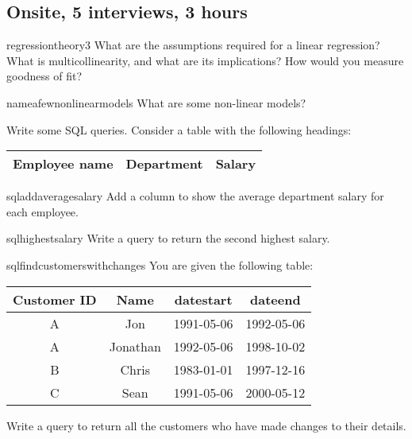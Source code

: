 \documentclass[a4paper]{article}
\begin{document}
\clearpage





\clearpage
\subsection{Onsite, 5 interviews, 3 hours}
\begin{question}{regressiontheory3}
What are the assumptions required for a linear regression?
What is multicollinearity, and what are its implications?
How would you measure goodness of fit?
\end{question}


\begin{question}{nameafewnonlinearmodels}
What are some non-linear models?
\end{question}


\begin{questionwithnoanswer}
Write some SQL queries.
Consider a table with the following headings:
\begin{center}
\begin{tabular}{|c|c|c|}
\hline
   Employee name & Department & Salary \\
\hline
\end{tabular}
\end{center}
\end{questionwithnoanswer}

\begin{subquestion}{sqladdaveragesalary}
Add a column to show the average department salary for each employee.
\end{subquestion}


\begin{subquestion}{sqlhighestsalary}
Write a query to return the second highest salary.
\end{subquestion}



\begin{question}{sqlfindcustomerswithchanges}
You are given the following table:
\begin{center}
\begin{tabular}{|c|c|c|c|}
\hline
     Customer ID    &   Name     &  datestart     & dateend     \\
\hline
     A              &   Jon      &  1991-05-06    & 1992-05-06  \\
     A              &   Jonathan &  1992-05-06    & 1998-10-02  \\
     B              &   Chris    &  1983-01-01    & 1997-12-16  \\
     C              &   Sean     &  1991-05-06    & 2000-05-12  \\
\hline
\end{tabular}
\end{center}
Write a query to return all the customers who have made changes to their details.
\end{question}
\end{document}
